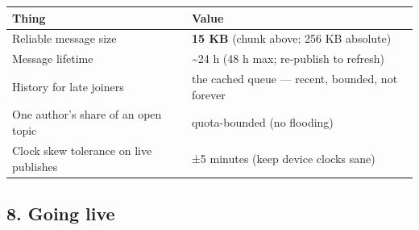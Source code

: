 \documentclass[
  nobib]{tufte-handout}
\newcounter{none} %
\begin{document}
{\def\LTcaptype{none} %
\begin{longtable}[]{@{}
  >{\raggedright\arraybackslash}p{}
  >{\raggedright\arraybackslash}p{}@{}}
\toprule\noalign{}
\begin{minipage}[b]{\linewidth}\raggedright
Thing
\end{minipage} & \begin{minipage}[b]{\linewidth}\raggedright
Value
\end{minipage} \\
\midrule\noalign{}
\endhead
\bottomrule\noalign{}
\endlastfoot
Reliable message size & \textbf{15 KB} (chunk above; 256 KB absolute) \\
Message lifetime & \textasciitilde24 h (48 h max; re-publish to
refresh) \\
History for late joiners & the cached queue --- recent, bounded, not
forever \\
One author's share of an open topic & quota-bounded (no flooding) \\
Clock skew tolerance on live publishes & ±5 minutes (keep device clocks
sane) \\
\end{longtable}
}

\subsection{8. Going live}\label{going-live}
\end{document}
